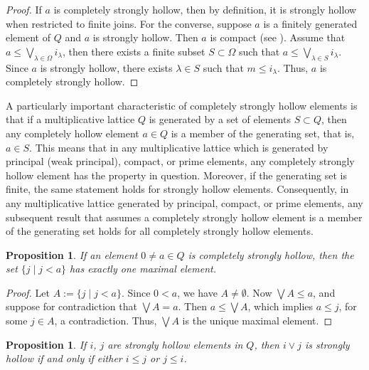\documentclass[11pt,english]{amsart}
\newtheorem{proposition}[theorem]{Proposition}
\theoremstyle{definition}
\numberwithin{equation}{section}
\theoremstyle{remark}
\def\leq{\leqslant}
\begin{document}
	\begin{proof}
		If $a$ is completely strongly hollow, then by definition, it is strongly hollow when restricted to finite joins.
		For the converse, suppose $a$ is a finitely generated element of $Q$ and $a$ is strongly hollow. Then $a$ is compact (see \cite[Proposition~2.1]{Cal}). Assume that $a \leq \bigvee_{\lambda \in \Omega} i_\lambda$, then there exists a finite subset $S \subset \Omega$ such that $a \leq \bigvee_{\lambda \in S} i_\lambda$. Since $a$ is strongly hollow, there exists $\lambda \in S$ such that $m \leq i_\lambda$. Thus, $a$ is completely strongly hollow.
	\end{proof}
	
	A particularly important characteristic of completely strongly hollow elements is that if a multiplicative lattice $Q$ is generated by a set of elements \(S\subset Q\), then any completely hollow element \(a\in Q\) is a member of the generating set, that is, \(a\in S\). This means that in any multiplicative lattice which is generated by principal (weak principal), compact, or prime elements, any completely strongly hollow element has the property in question. Moreover, if the generating set is finite, the same statement holds for strongly hollow elements. Consequently, in any multiplicative lattice generated by principal, compact, or prime elements, any subsequent result that assumes a completely strongly hollow element is a member of the generating set holds for all completely strongly hollow elements.
	
	
	\begin{proposition}
		If an element $0\neq a \in Q$ is completely strongly hollow, then the set $\{ j \mid j < a \}$ has exactly one maximal element.
	\end{proposition}
	
	\begin{proof}
		Let $A := \{ j \mid j < a \}$. Since $0 < a$, we have $A \neq \emptyset$. Now $\bigvee A \leq a$, and suppose for contradiction that $\bigvee A = a$. Then $a \leq \bigvee A$, which implies $a \leq j$, for some $j \in A$, a contradiction. Thus, $\bigvee A$ is the unique maximal element.
	\end{proof}
	
	\begin{proposition}\label{T2.3}
		If $i$, $j$ are strongly hollow elements in $Q$, then $i \vee j$ is strongly hollow if and only if either $i \leq j$ or $j \leq i$.
	\end{proposition}
	
\end{document}
